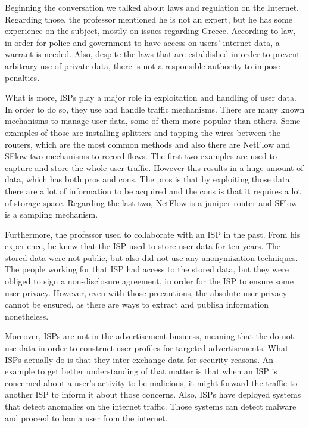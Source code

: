 Beginning the conversation we talked about laws and regulation on the Internet. 
Regarding those, the professor mentioned he is not an expert, but he has some 
experience on the subject, mostly on issues regarding Greece. According to law, 
in order for police and government to have access on users’ internet data, a 
warrant is needed. Also, despite the laws that are established in order to 
prevent arbitrary use of private data, there is not a responsible authority to 
impose penalties.

What is more, ISPs play a major role in exploitation and handling of user data. 
In order to do so, they use and handle traffic mechanisms. There are many known 
mechanisms to manage user data, some of them more popular than others. Some 
examples of those are installing splitters and tapping the wires between the 
routers, which are the most common methods and also there are NetFlow and SFlow 
two mechanisms to record flows. The first two examples are used to capture and 
store the whole user traffic. However this results in a huge amount of data, 
which has both pros and cons. The pros is that by exploiting those data there 
are a lot of information to be acquired and the cons is that it requires a lot 
of storage space. Regarding the last two, NetFlow is a juniper router and SFlow 
is a sampling mechanism.

Furthermore, the professor used to collaborate with an ISP in the past. From his 
experience, he knew that the ISP used to store user data for ten years. The 
stored data were not public, but also did not use any anonymization techniques. 
The people working for that ISP had access to the stored data, but they were 
obliged to sign a non-disclosure agreement, in order for the ISP to ensure some 
user privacy. However, even with those precautions, the absolute user privacy 
cannot be ensured, as there are ways to extract and publish information 
nonetheless. 

Moreover, ISPs are not in the advertisement business, meaning that the do not 
use data in order to construct user profiles for targeted advertisements. What 
ISPs actually do is that they inter-exchange data for security reasons. An 
example to get better understanding of that matter is that when an ISP is 
concerned about a user's activity to be malicious, it might forward the traffic 
to another ISP to inform it about those concerns. Also, ISPs have deployed 
systems that detect anomalies on the internet traffic. Those systems can detect 
malware and proceed to ban a user from the internet.

